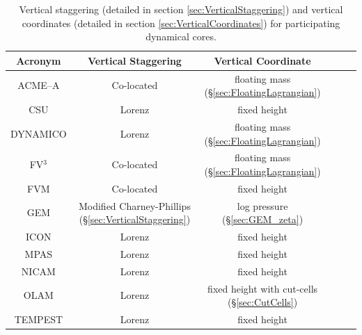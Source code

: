 \documentclass[gmd, manuscript]{copernicus}
\begin{document}
\begin{table}[p]
\caption{Vertical staggering (detailed in section \ref{sec:VerticalStaggering}) and vertical coordinates (detailed in section \ref{sec:VerticalCoordinates}) for participating dynamical cores.} \label{tab:ModelsVertical}
\begin{center}
\begin{tabular}{cccccc}
\hline Acronym & Vertical Staggering & Vertical Coordinate \\ \hline 
ACME--A & Co-located & floating mass (\S \ref{sec:FloatingLagrangian}) \\
CSU & Lorenz & fixed height \\
DYNAMICO & Lorenz & floating mass (\S \ref{sec:FloatingLagrangian}) \\
FV$^3$ & Co-located & floating mass (\S \ref{sec:FloatingLagrangian}) \\
FVM & Co-located & fixed height \\
GEM & Modified Charney-Phillips (\S \ref{sec:VerticalStaggering}) & log pressure (\S \ref{sec:GEM_zeta})  \\
ICON & Lorenz & fixed height \\
MPAS & Lorenz & fixed height \\
NICAM & Lorenz & fixed height \\
OLAM & Lorenz & fixed height with cut-cells (\S \ref{sec:CutCells}) \\
TEMPEST & Lorenz & fixed height \\
\hline 
\end{tabular}
\end{center}
\end{table}
\end{document}
